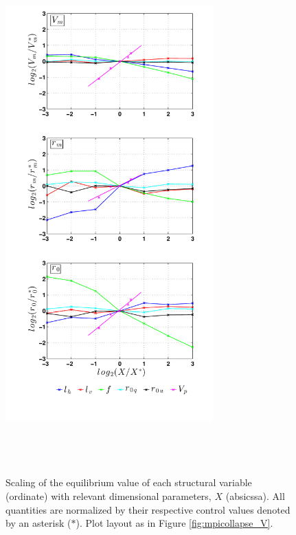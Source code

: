 \documentclass[12pt]{article}
\begin{document}
\begin{figure}[h!]
\centering
  \noindent\includegraphics[width=8cm,height=20cm]{FIGURES_TC_RCE_equilibrium_v2.0/Fig6_Dimensional_scaling.pdf}
\caption{Scaling of the equilibrium value of each structural variable (ordinate) with relevant dimensional parameters, $X$ (absicssa). All quantities are normalized by their respective control values denoted by an asterisk ($*$). Plot layout as in Figure \ref{fig:mpicollapse_V}.}
\label{fig:dimscaling}
\end{figure}
\end{document}
